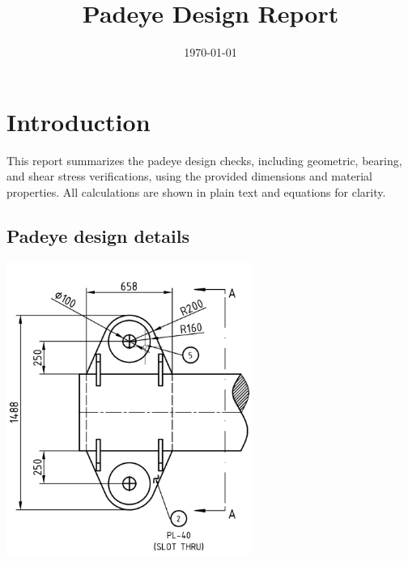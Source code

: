 \documentclass[12pt]{article}
\title{Padeye Design Report}
\author{}
\date{\today}
\begin{document}
\maketitle

\section{Introduction}
This report summarizes the padeye design checks, including geometric, bearing, and shear stress verifications, using the provided dimensions and material properties. All calculations are shown in plain text and equations for clarity.

\subsection*{Padeye design details}
\begin{center}
\includegraphics[width=0.6\textwidth]{image-1.png}
\end{center}
\end{document}
